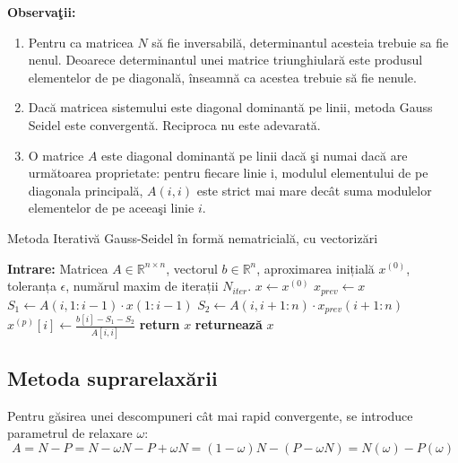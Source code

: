 \documentclass{exam}
\theoremstyle{definition}
\begin{document}
\vspace{100pt}
\par \textbf{Observa\c{t}ii:}
\begin{enumerate}
        \item  Pentru ca matricea $N$ să fie inversabilă, determinantul acesteia trebuie sa fie nenul. Deoarece determinantul unei matrice triunghiulară este produsul elementelor de pe diagonală, înseamnă ca acestea trebuie să fie nenule.
	\item  Dac\u{a} matricea sistemului este diagonal dominant\u{a} pe linii, metoda Gauss Seidel este convergent\u{a}. Reciproca nu este adevarat\u{a}.
	\item  O matrice $A$ este diagonal dominant\u{a} pe linii dac\u{a} \c{s}i numai dac\u{a} are urm\u{a}toarea proprietate: pentru fiecare linie i, modulul elementului de pe diagonala principal\u{a}, $A(i,i)$ este strict mai mare dec\^{a}t suma modulelor elementelor de pe aceea\c{s}i linie $i$.
\end{enumerate}

\begin{algorithm}[H]
\caption{Metoda Iterativă Gauss-Seidel în formă nematricială, cu vectorizări}
\label{alg:gauss_seidel}
\begin{algorithmic}[1]
    \State \textbf{Intrare:} Matricea \( A \in \mathbb{R}^{n \times n} \), vectorul \( b \in \mathbb{R}^{n} \), aproximarea inițială \( x^{(0)} \), toleranța \( \epsilon \), numărul maxim de iterații \( N_{iter} \).
    \State \( x \leftarrow x^{(0)} \)  
        \State \(x_{prev} \gets x \)
            \State \( S_1 \gets A(i,1:i-1)\cdot x(1:i-1) \) 
            \State \( S_2 \gets A(i,i+1:n) \cdot x_{prev}(i+1:n) \) 
            \State \( x^{(p)}[i] \gets \frac{b[i] - S_1 - S_2}{A[i,i]} \) 
        \EndFor
            \State \textbf{return} \( x \)
        \EndIf
    \EndFor
    \State \textbf{returnează} \( x \)
\end{algorithmic}
\end{algorithm}


\subsection{Metoda suprarelax\u{a}rii}
Pentru g\u{a}sirea unei descompuneri c\^{a}t mai rapid convergente, se introduce parametrul de relaxare $\omega$:
$$A = N - P = N - \omega N - P + \omega N = (1 - \omega)N - (P - \omega N) = N(\omega) - P(\omega)$$
\end{document}
